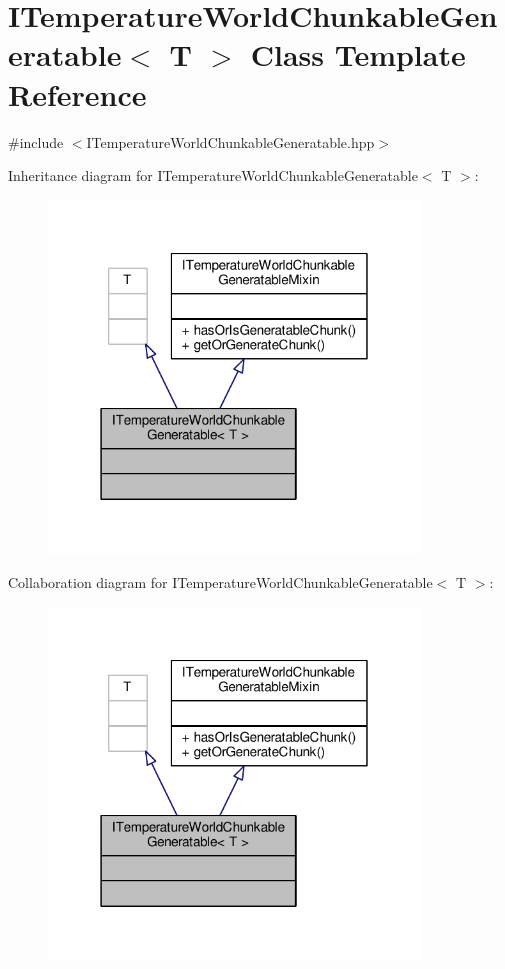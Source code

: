 \hypertarget{class_i_temperature_world_chunkable_generatable}{\section{I\-Temperature\-World\-Chunkable\-Generatable$<$ T $>$ Class Template Reference}
\label{class_i_temperature_world_chunkable_generatable}
}


{\ttfamily \#include $<$I\-Temperature\-World\-Chunkable\-Generatable.\-hpp$>$}



Inheritance diagram for I\-Temperature\-World\-Chunkable\-Generatable$<$ T $>$\-:
\nopagebreak
\begin{figure}[H]
\begin{center}
\leavevmode
\includegraphics[width=279pt]{class_i_temperature_world_chunkable_generatable__inherit__graph}
\end{center}
\end{figure}


Collaboration diagram for I\-Temperature\-World\-Chunkable\-Generatable$<$ T $>$\-:
\nopagebreak
\begin{figure}[H]
\begin{center}
\leavevmode
\includegraphics[width=279pt]{class_i_temperature_world_chunkable_generatable__coll__graph}
\end{center}
\end{figure}
